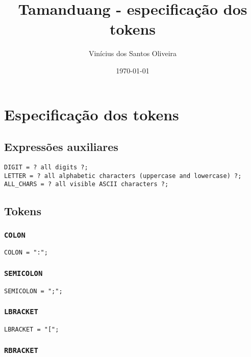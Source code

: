 \documentclass[12pt, a4paper]{article}
\title{Tamanduang - especificação dos tokens}
\author{Vinícius dos Santos Oliveira}
\date{\today}
\begin{document}
\maketitle
\pagebreak
\tableofcontents
\pagebreak

\section{Especificação dos tokens}

\subsection{Expressões auxiliares}

\begin{verbatim}
DIGIT = ? all digits ?;
LETTER = ? all alphabetic characters (uppercase and lowercase) ?;
ALL_CHARS = ? all visible ASCII characters ?;
\end{verbatim}

\subsection{Tokens}

\subsubsection{\texttt{COLON}}

\begin{verbatim}
COLON = ":";
\end{verbatim}

\subsubsection{\texttt{SEMICOLON}}

\begin{verbatim}
SEMICOLON = ";";
\end{verbatim}

\subsubsection{\texttt{LBRACKET}}

\begin{verbatim}
LBRACKET = "[";
\end{verbatim}

\subsubsection{\texttt{RBRACKET}}
\end{document}
